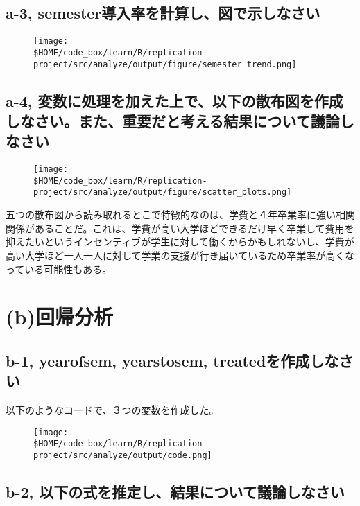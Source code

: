 \documentclass[a4paper]{jsarticle}
\begin{document}
\subsection*{a-3, semester導入率を計算し、図で示しなさい}

\begin{figure}[H]
  \centering
  \texttt{[image: \\\$HOME/code\_box/learn/R/replication-project/src/analyze/output/figure/semester\_trend.png]}

\end{figure}

\subsection*{a-4, 変数に処理を加えた上で、以下の散布図を作成しなさい。また、重要だと考える結果について議論しなさい}

\begin{figure}[H]
  \centering
  \texttt{[image: \\\$HOME/code\_box/learn/R/replication-project/src/analyze/output/figure/scatter\_plots.png]}

\end{figure}


五つの散布図から読み取れるとこで特徴的なのは、学費と４年卒業率に強い相関関係があることだ。これは、学費が高い大学ほどできるだけ早く卒業して費用を抑えたいというインセンティブが学生に対して働くからかもしれないし、学費が高い大学ほど一人一人に対して学業の支援が行き届いているため卒業率が高くなっている可能性もある。

\section*{(b)回帰分析}

\subsection*{b-1, yearofsem, yearstosem, treatedを作成しなさい}

以下のようなコードで、３つの変数を作成した。

\begin{figure}[H]
  \centering
  \texttt{[image: \\\$HOME/code\_box/learn/R/replication-project/src/analyze/output/code.png]}

\end{figure}

\subsection*{b-2, 以下の式を推定し、結果について議論しなさい}
\end{document}
